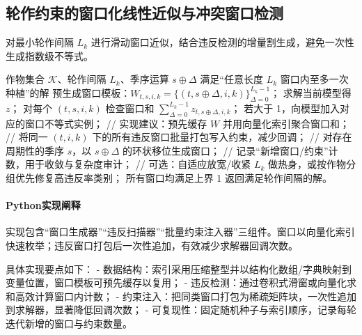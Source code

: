 \subsection{轮作约束的窗口化线性近似与冲突窗口检测}
对最小轮作间隔 $L_k$ 进行滑动窗口近似，结合违反检测的增量割生成，避免一次性生成指数级不等式。
\begin{algorithm}[H]
  \caption{轮作约束的窗口化线性近似与冲突窗口检测}
  \label{lst:rotation-cuts}
  \label{lst:stack-area}
  \begin{algorithmic}[1]
    \Require 作物集合 $\mathcal{K}$、轮作间隔 $L_k$、季序运算 $s\oplus\Delta$
    \Ensure 满足“任意长度 $L_k$ 窗口内至多一次种植”的解
    \State 预生成窗口模板：$W_{t,s,i,k}=\{(t, s\oplus\Delta, i, k)\}_{\Delta=0}^{L_k-1}$；
    \Repeat
      \State 求解当前模型得 $z$；
      \State 对每个 $(t,s,i,k)$ 检查窗口和 $\sum\limits_{\Delta=0}^{L_k-1} z_{t, s\oplus\Delta, i, k}$；
      \State 若大于 1，向模型加入对应的窗口不等式实例；
      \State // 实现建议：预先缓存 $W$ 并用向量化索引聚合窗口和；
      \State // 将同一 $(t,i,k)$ 下的所有违反窗口批量打包写入约束，减少回调；
      \State // 对存在周期性的季序 $s$，以 $s\oplus\Delta$ 的环状移位生成窗口；
      \State // 记录“新增窗口/约束”计数，用于收敛与复杂度审计；
      \State // 可选：自适应放宽/收紧 $L_k$ 做热身，或按作物分组优先修复高违反率类别；
    \Until 所有窗口均满足上界 1
    \State 返回满足轮作间隔的解。
  \end{algorithmic}
\end{algorithm}
\paragraph{Python实现阐释}
实现包含“窗口生成器”“违反扫描器”“批量约束注入器”三组件。窗口以向量化索引快速枚举；违反窗口打包后一次性追加，有效减少求解器回调次数。

具体实现要点如下：
- 数据结构：索引采用压缩整型并以结构化数组/字典映射到变量位置，窗口模板可预先缓存以复用；
- 违反检测：通过卷积式滑窗或向量化求和高效计算窗口内计数；
- 约束注入：把同类窗口打包为稀疏矩阵块，一次性追加到求解器，显著降低回调次数；
- 可复现性：固定随机种子与索引顺序，记录每轮迭代新增的窗口与约束数量。

\newpage

\begin{center}
\begin{minipage}[t][\dimexpr\textheight-1em\relax]{0.98\linewidth}

\end{minipage}
\end{center}

